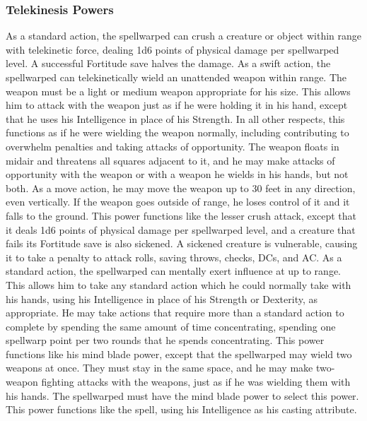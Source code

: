 \subsubsection{Telekinesis Powers}
 As a standard action, the spellwarped can crush a creature or object within \rngclose range with telekinetic force, dealing 1d6 points of physical damage  per spellwarped level. A successful Fortitude save halves the damage.
 As a swift action, the spellwarped can telekinetically wield an unattended weapon within \rngclose range. The weapon must be a light or medium weapon appropriate for his size. This allows him to attack with the weapon just as if he were holding it in his hand, except that he uses his Intelligence in place of his Strength. In all other respects, this functions as if he were wielding the weapon normally, including contributing to overwhelm penalties and taking attacks of opportunity. The weapon floats in midair and threatens all squares adjacent to it, and he may make attacks of opportunity with the weapon or with a weapon he wields in his hands, but not both.
As a move action, he may move the weapon up to 30 feet in any direction, even vertically. If the weapon goes outside of \rngclose range, he loses control of it and it falls to the ground.
 This power functions like the lesser crush attack, except that it deals 1d6 points of physical damage per spellwarped level, and a creature that fails its Fortitude save is also sickened. A sickened creature is vulnerable, causing it to take a  penalty to attack rolls, saving throws, checks, DCs, and AC.
 As a standard action, the spellwarped can mentally exert influence at up to \rngclose range. This allows him to take any standard action which he could normally take with his hands, using his Intelligence in place of his Strength or Dexterity, as appropriate. He may take actions that require more than a standard action to complete by spending the same amount of time concentrating, spending one spellwarp point per two rounds that he spends concentrating.
 This power functions like his mind blade power, except that the spellwarped may wield two weapons at once. They must stay in the same space, and he may make two-weapon fighting attacks with the weapons, just as if he was wielding them with his hands. The spellwarped must have the mind blade power to select this power.
 This power functions like the  spell, using his Intelligence as his casting attribute.
